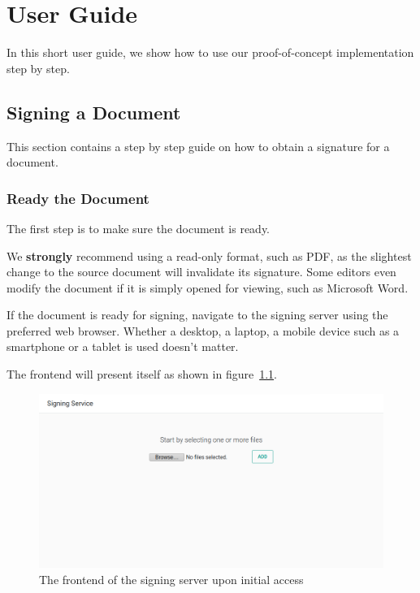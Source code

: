 \chapter{User Guide}
\label{ch:appendix_user_guide}
In this short user guide, we show how to use our proof-of-concept implementation step by step.

\section{Signing a Document}\label{sec:signing-a-document}
This section contains a step by step guide on how to obtain a signature for a document.

\subsection{Ready the Document}\label{subsec:ready-the-document}
The first step is to make sure the document is ready.

We \textbf{strongly} recommend using a read-only format,
such as \gls{PDF},
as the slightest change to the source document will invalidate its signature.
Some editors even modify the document if it is simply opened for viewing,
such as Microsoft Word.

If the document is ready for signing, navigate to the signing server using the preferred web browser.
Whether a desktop, a laptop, a mobile device such as a smartphone or a tablet is used doesn't matter.

The frontend will present itself as shown in figure~\ref{fig:userguide0}.
\begin{figure}[H]
    \begin{center}
        \includegraphics[width=\linewidth]{images/userguide_sign_0.png}
    \end{center}
    \caption{The frontend of the signing server upon initial access}
    \label{fig:userguide0}
\end{figure}

